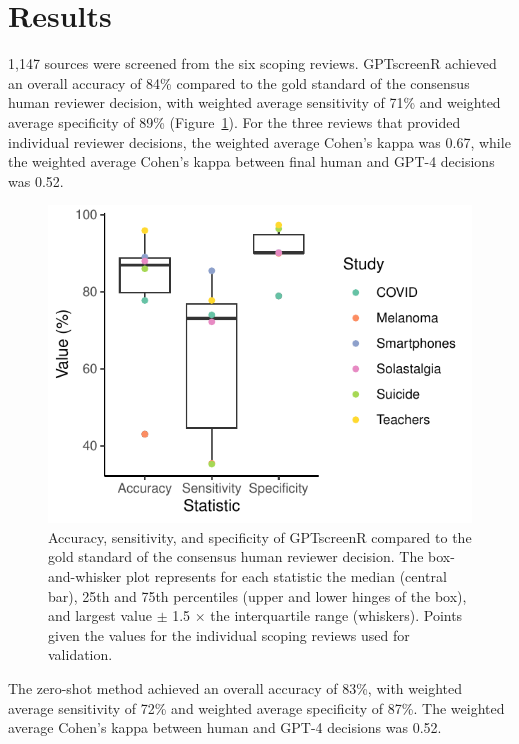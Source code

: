 \documentclass[10pt,a4paper,twocolumn]{article}
\begin{document}
\section{Results}

1,147 sources were screened from the six scoping reviews. GPTscreenR achieved an overall accuracy of 84\% compared to the gold standard of the consensus human reviewer decision, with weighted average sensitivity of 71\% and weighted average specificity of 89\% (Figure~\ref{fig:statistics}). For the three reviews that provided individual reviewer decisions, the weighted average Cohen's kappa was 0.67, while the weighted average Cohen's kappa between final human and GPT-4 decisions was 0.52.

\begin{figure}
\centering
  \includegraphics[width=\columnwidth]{./fig_4.pdf}
\caption{Accuracy, sensitivity, and specificity of GPTscreenR compared to the gold standard of the consensus human reviewer decision. The box-and-whisker plot represents for each statistic the median (central bar), 25th and 75th percentiles (upper and lower hinges of the box), and largest value \(\pm\) 1.5 \(\times\) the interquartile range (whiskers). Points given the values for the individual scoping reviews used for validation.}
  \label{fig:statistics}
\end{figure}

The zero-shot method achieved an overall accuracy of 83\%, with weighted average sensitivity of 72\% and weighted average specificity of 87\%. The weighted average Cohen's kappa between human and GPT-4 decisions was 0.52.
\end{document}
